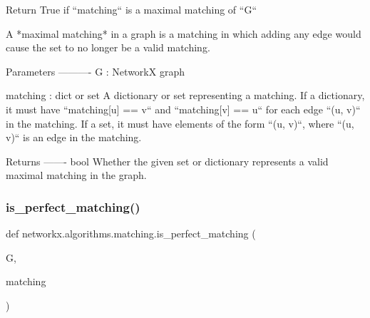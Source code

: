 \begin{DoxyVerb}Return True if ``matching`` is a maximal matching of ``G``

A *maximal matching* in a graph is a matching in which adding any
edge would cause the set to no longer be a valid matching.

Parameters
----------
G : NetworkX graph

matching : dict or set
    A dictionary or set representing a matching. If a dictionary, it
    must have ``matching[u] == v`` and ``matching[v] == u`` for each
    edge ``(u, v)`` in the matching. If a set, it must have elements
    of the form ``(u, v)``, where ``(u, v)`` is an edge in the
    matching.

Returns
-------
bool
    Whether the given set or dictionary represents a valid maximal
    matching in the graph.\end{DoxyVerb}
 \mbox{\label{namespacenetworkx_1_1algorithms_1_1matching_a95c6af7688e43ad4e935b4fa6291f4e5}} 
\subsubsection{\texorpdfstring{is\+\_\+perfect\+\_\+matching()}{is\_perfect\_matching()}}
{\footnotesize\ttfamily def networkx.\+algorithms.\+matching.\+is\+\_\+perfect\+\_\+matching (\begin{DoxyParamCaption}\item[{}]{G,  }\item[{}]{matching }\end{DoxyParamCaption})}

